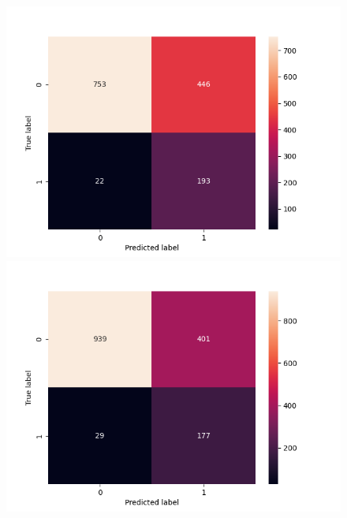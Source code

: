 \begin{figure}[t!]
    \includegraphics[width=\linewidth]{figures/results/ad-hoc/nn/calibrate/2021-12-06_17.03.17.314982_set_3_confusion_matrix_raw.png}
    \endminipage
    \includegraphics[width=\linewidth]{figures/results/ad-hoc/nn/calibrate/2021-12-06_17.03.17.314982_set_4_confusion_matrix_raw.png}
    \endminipage


\end{figure}
